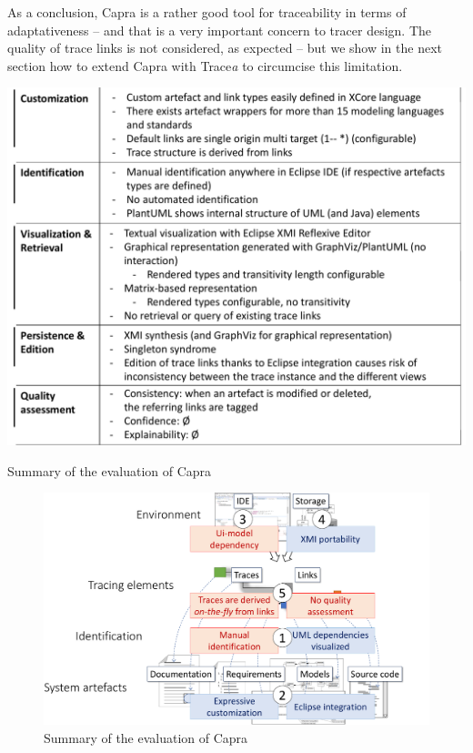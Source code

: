 As a conclusion, Capra is a rather good tool for traceability in terms of adaptativeness -- and that is a very important concern to tracer design. The quality of trace links is not considered, as expected -- but we show in the next section how to extend Capra with Trace\textit{a} to circumcise this limitation.

\begin{table}[h]   
	\centering
	\includegraphics[width=.85\linewidth]{images/evaluation-table-capra.pdf}
	\caption{Summary of the evaluation of Capra}
	\label{tab:evaluationcapra}
\end{table}
\begin{figure}[h]  
	\centering
	\includegraphics[width=.7\linewidth]{images/evaluation-points-capra.pdf}
	\caption{Summary of the evaluation of Capra}
	\label{fig:evaluationcapra}
\end{figure}

